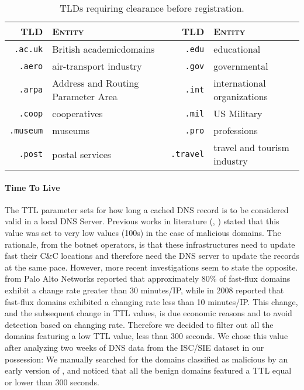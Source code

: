 \begin{table}[!htp]
    \centering
    \begin{tabular}{rp{4cm}rp{4cm}}
        \toprule
        \textsc{TLD} & \textsc{Entity} & \textsc{TLD} & \textsc{Entity} \\
        \midrule
        \texttt{.ac.uk} & British academic\newline domains & \texttt{.edu} & educational \\
        \texttt{.aero} & air-transport industry   & \texttt{.gov} & governmental \\
        \texttt{.arpa} & Address and Routing \newline Parameter Area & \texttt{.int} & international \newline organizations \\
        \texttt{.coop} & cooperatives & \texttt{.mil} & US Military \\
        \texttt{.museum} & museums & \texttt{.pro} & professions \\
        \texttt{.post} & postal services & \texttt{.travel} & travel and tourism \newline industry \\
        \bottomrule
    \end{tabular}
    \caption{TLDs requiring clearance before registration.}
    \label{tab:tlds_clearance}
\end{table}

\paragraph{Time To Live} %
\label{par:time_to_live}
The TTL parameter sets for how long a cached DNS record is to be considered valid in a local
DNS Server. Previous works in literature (\cite{bilge2011exposure}, \cite{holz2008})
stated that this value was set to very low values (100s) in the case of malicious
domains. The rationale, from the botnet operators, is that these infrastructures need to update fast their C\&C locations and therefore need the DNS server to update the records at the same pace. However, more recent investigations seem to state the
opposite. \citet{xu2013} from Palo Alto Networks reported that approximately 80\%
of fast-flux domains exhibit a change rate greater than 30 minutes/IP, while in
2008 \citet{holz2008} reported that fast-flux domains
exhibited a changing rate less than 10 minutes/IP. This change, and the subsequent
change in TTL values, is due economic reasons and to avoid detection based on
changing rate. Therefore we decided to filter out all the domains featuring a low
TTL value, less than 300 seconds. We chose this value after analyzing two weeks
of DNS data from the ISC/SIE dataset in our possession: We manually searched for
the domains classified as malicious by an early version of \thesystem, and noticed
that all the benign domains featured a TTL equal or lower than 300 seconds.


